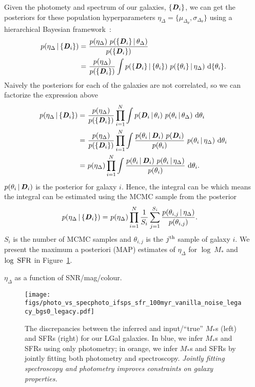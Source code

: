 Given the photomety and spectrum of our galaxies, $\{{\textbf{\textit{D}}}_i\}$, we can get the posteriors
for these population hyperparameters $\eta_\Delta = \{\mu_{\Delta_{\theta}},
\sigma_{\Delta_{\theta}}\}$ 
using a hierarchical Bayesian framework~\citep{hogg2010a}: 
\begin{align}
p(\eta_\Delta \,|\, \{{\textbf{\textit{D}}_i}\}) 
    =&~\frac{p(\eta_\Delta)~p( \{{\textbf{\textit{D}}_i}\} \,|\, \theta_{\Delta})}{p(\{{\textbf{\textit{D}}_i}\})}\\
    =&~\frac{p(\eta_\Delta)}{p(\{{\textbf{\textit{D}}_i}\})}\int p(\{{\textbf{\textit{D}}_i}\} \,|\, \{\theta_i\})~p(\{\theta_i\} \,|\, \eta_\Delta)~{\rm d}\{\theta_i\}.
\end{align} 
Naively the posteriors for each of the galaxies are not correlated, so we can factorize the expression above
\begin{align}
p(\eta_\Delta \,|\, \{{\textbf{\textit{D}}_i}\}) 
    =&~\frac{p(\eta_\Delta)}{p(\{{\textbf{\textit{D}}_i}\})}\prod\limits_{i=1}^N\int p({\textbf{\textit{D}}_i} \,|\, \theta_i)~p(\theta_i \,|\, \theta_\Delta)~{\rm d}\theta_i\\
    =&~\frac{p(\eta_\Delta)}{p(\{{\textbf{\textit{D}}_i}\})}\prod\limits_{i=1}^N\int
    \frac{p(\theta_i \,|\, {\textbf{\textit{D}}_i})~p({\textbf{\textit{D}}_i})}{p(\theta_i)}~p(\theta_i
    \,|\, \eta_\Delta)~{\rm d}\theta_i\\
    =&~p(\eta_\Delta)\prod\limits_{i=1}^N\int \frac{p(\theta_i \,|\, {\textbf{\textit{D}}_i})~p(\theta_i \,|\, \eta_\Delta)}{p(\theta_i)}~{\rm d}\theta_i.
\end{align} 
$p(\theta_i \,|\, {\textbf{\textit{D}}_i})$ is the posterior for galaxy $i$. Hence, the
integral can be which means the integral can be estimated using the MCMC sample
from the posterior
\begin{align}
p(\eta_\Delta \,|\, \{{\textbf{\textit{D}}_i}\}) 
    =&~p(\eta_\Delta)\prod\limits_{i=1}^N\frac{1}{S_i}\sum\limits_{j=1}^{S_i}
    \frac{p(\theta_{i,j} \,|\, \eta_\Delta)}{p(\theta_{i,j})}.
\end{align} 
$S_i$ is the number of MCMC samples and $\theta_{i,j}$ is the $j^{\rm th}$
sample of galaxy $i$. We present the maximum a posteriori (MAP) estimates of
$\eta_\Delta$ for $\log~M_*$ and $\log~{\rm SFR}$ in
Figure~\ref{fig:specphoto}. 


$\eta_\Delta$ as a function of SNR/mag/colour. 

\begin{figure}
\begin{center}
\texttt{[image: figs/photo\_vs\_specphoto\_ifsps\_sfr\_100myr\_vanilla\_noise\_legacy\_bgs0\_legacy.pdf]} 
\caption{The discrepancies between the inferred and input/``true'' $M_*$s (left) and SFRs 
(right) for our {\sc LGal} galaxies. In blue, we infer $M_*$s and SFRs using only photometry;
in orange, we infer $M_*$s and SFRs by jointly fitting both photometry and spectroscopy. 
{\em Jointly fitting spectroscopy and photometry improves constraints on galaxy properties.}
}
\label{fig:specphoto}
\end{center}
\end{figure}


